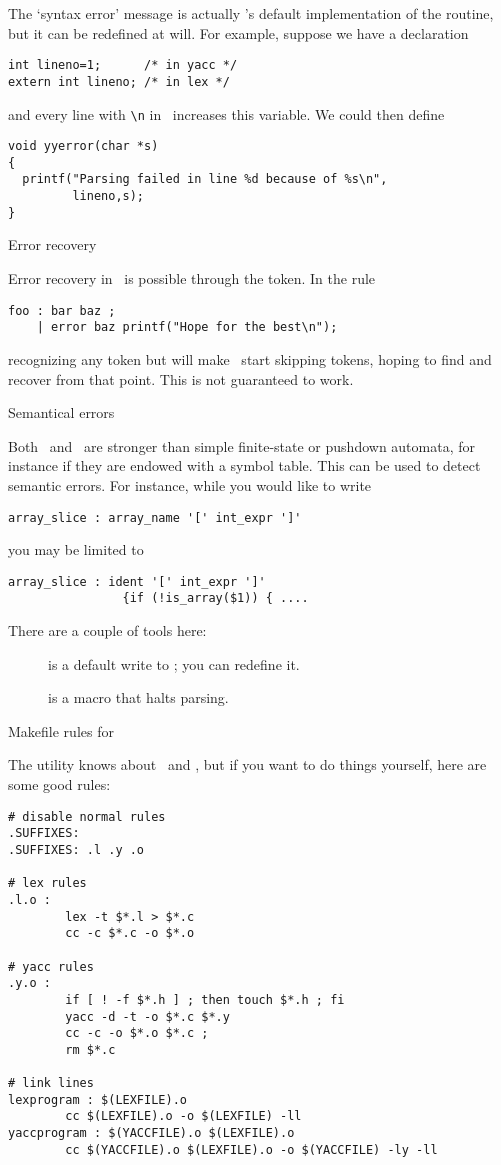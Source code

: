 The `syntax error' message is actually \yacc's default implementation
of the  routine, but it can be redefined at
will. For example, suppose we have a declaration
\begin{verbatim}
int lineno=1;      /* in yacc */
extern int lineno; /* in lex */
\end{verbatim}
and every line with \verb+\n+ in \lex\ increases this variable. We
could then define
\begin{verbatim}
void yyerror(char *s)
{
  printf("Parsing failed in line %d because of %s\n",
         lineno,s);
}
\end{verbatim}

 {Error recovery}

Error recovery in \yacc\ is possible through the  token. In
the rule
\begin{verbatim}
foo : bar baz ;
    | error baz printf("Hope for the best\n");
\end{verbatim}
recognizing any token but  will make \yacc\ start skipping
tokens, hoping to find  and recover from that point.
This is not guaranteed to work.

 {Semantical errors}

Both \lex\ and \yacc\ are stronger than simple finite-state or
pushdown automata, for instance if they are endowed with a symbol
table. This can be used to detect semantic errors. For instance, while
you would like to write
\begin{verbatim}
array_slice : array_name '[' int_expr ']'
\end{verbatim}
you may be limited to
\begin{verbatim}
array_slice : ident '[' int_expr ']'
                {if (!is_array($1)) { ....
\end{verbatim}
There are a couple of tools here:
\begin{description}
\item[] is a default write to ; you can
  redefine it.
\item[] is a macro that halts parsing.
\end{description}

 {Makefile rules for \yacc}

The  utility knows about \lex\ and \yacc, but if you want to
do things yourself, here are some good rules:
\begin{verbatim}
# disable normal rules
.SUFFIXES:
.SUFFIXES: .l .y .o

# lex rules
.l.o :
        lex -t $*.l > $*.c
        cc -c $*.c -o $*.o

# yacc rules
.y.o :
        if [ ! -f $*.h ] ; then touch $*.h ; fi
        yacc -d -t -o $*.c $*.y 
        cc -c -o $*.o $*.c ;
        rm $*.c

# link lines
lexprogram : $(LEXFILE).o
        cc $(LEXFILE).o -o $(LEXFILE) -ll
yaccprogram : $(YACCFILE).o $(LEXFILE).o
        cc $(YACCFILE).o $(LEXFILE).o -o $(YACCFILE) -ly -ll
\end{verbatim}

